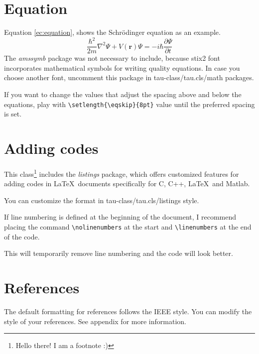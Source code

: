 \documentclass[9pt,a4paper,twocolumn,twoside]{tau-class/tau}
\begin{document}
\section{Equation}

    Equation \ref{ec:equation}, shows the Schrödinger equation as an example. 
	\begin{equation} \label{ec:equation}
		\frac{\hbar^2}{2m}\nabla^2\Psi + V(\mathbf{r})\Psi = -i\hbar \frac{\partial\Psi}{\partial t}
	\end{equation} 
    The \textit{amssymb} package was not necessary to include, because stix2 font incorporates mathematical symbols for writing quality equations. In case you choose another font, uncomment this package in tau-class/tau.cls/math packages.
	
    If you want to change the values that adjust the spacing above and below the equations, play with \verb|\setlength{\eqskip}{8pt}| value until the preferred spacing is set.
	
\section{Adding codes}
	
    This class\footnote{Hello there! I am a footnote :)} includes the \textit{listings} package, which offers customized features for adding codes in \LaTeX\ documents specifically for C, C++, \LaTeX\ and Matlab. 
	
    You can customize the format in tau-class/tau.cls/listings style.
	
    
	
    If line numbering is defined at the beginning of the document, I recommend placing the command \verb|\nolinenumbers| at the start and \verb|\linenumbers| at the end of the code. 
    
    This will temporarily remove line numbering and the code will look better.
	
\section{References}

    The default formatting for references follows the IEEE style. You can modify the style of your references. See appendix for more information.
    

\printbibliography

\end{document}
